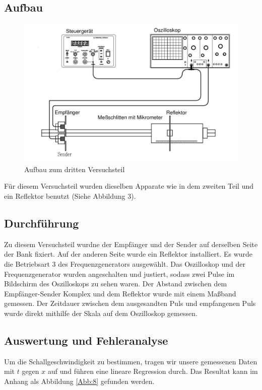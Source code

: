 \documentclass[11pt,a4paper]{article}
\begin{document}
\subsection{Aufbau}
\begin{figure}[h]
	\centering
	\includegraphics[scale=0.5]{Abb3}
	\caption{Aufbau zum dritten Versuchsteil}
\end{figure}
Für diesem Versuchsteil wurden dieselben Apparate wie in dem zweiten Teil und ein Reflektor benutzt (Siehe Abbildung 3). 

\subsection{Durchführung}
Zu diesem Versuchsteil wurdne der Empfänger und der Sender auf derselben Seite der Bank fixiert. Auf der anderen Seite wurde ein Reflektor installiert. Es wurde die Betriebsart 3 des Frequenzgenerators ausgewählt. Das Oszilloskop und der Frequenzgenerator wurden angeschalten und justiert, sodass zwei Pulse im Bildschirm des Oszilloskops zu sehen waren. Der Abstand zwischen dem Empfänger-Sender Komplex und dem Reflektor wurde mit einem Maßband gemessen. Der Zeitdauer zwischen dem ausgesandten Puls und empfangenen Puls wurde direkt mithilfe der Skala auf dem Oszilloskop gemessen. 

\subsection{Auswertung und Fehleranalyse}

Um die Schallgeschwindigkeit zu bestimmen, tragen wir unsere gemessenen Daten mit $t$ gegen $x$ auf und f\"uhren eine lineare Regression durch.  Das Resultat kann im Anhang als Abbildung \ref{Abb:8} gefunden werden.
\end{document}
